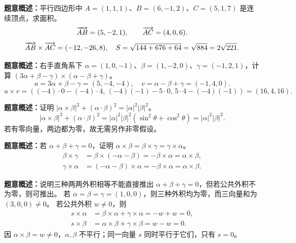 \textbf{题意概述：}平行四边形中 $A=(1,1,1)$、$B=(6,-1,2)$、$C=(5,1,7)$ 是连续顶点，求面积。
\[
\overrightarrow{AB}=(5,-2,1),\qquad \overrightarrow{AC}=(4,0,6).
\]
\[
\overrightarrow{AB}\times\overrightarrow{AC}=(-12,-26,8),
\quad S=\sqrt{144+676+64}=\sqrt{884}=2\sqrt{221}.
\]

\textbf{题意概述：}右手直角系下 $\alpha=(1,0,-1)$、$\beta=(1,-2,0)$、$\gamma=(-1,2,1)$，计算 $(3\alpha+\beta-\gamma)\times(\alpha-\beta+\gamma)$。
\[
u=3\alpha+\beta-\gamma=(5,-4,-4),\quad
v=\alpha-\beta+\gamma=(-1,4,0).
\]
\[
u\times v=\left((-4)\cdot0-(-4)\cdot4,\,
(-4)(-1)-5\cdot0,\,5\cdot4-(-4)(-1)\right)
=(16,4,16).
\]

\textbf{题意概述：}证明 $|\alpha\times\beta|^2+(\alpha\cdot\beta)^2=|\alpha|^2|\beta|^2$。
\[
|\alpha\times\beta|^2+(\alpha\cdot\beta)^2
=|\alpha|^2|\beta|^2(\sin^2\theta+\cos^2\theta)
=|\alpha|^2|\beta|^2.
\]
若有零向量，两边都为零，故无需另作非零假设。

\textbf{题意概述：}若 $\alpha+\beta+\gamma=0$，证明 $\alpha\times\beta=\beta\times\gamma=\gamma\times\alpha$。
\begin{align*}
\beta\times\gamma&=\beta\times(-\alpha-\beta)
=-\beta\times\alpha=\alpha\times\beta,\\
\gamma\times\alpha&=(-\alpha-\beta)\times\alpha
=-\beta\times\alpha=\alpha\times\beta.
\end{align*}

\textbf{题意概述：}说明三种两两外积相等不能直接推出 $\alpha+\beta+\gamma=0$，但若公共外积不为零，则可推出。
若 $\alpha=\beta=\gamma=(1,0,0)$，则三种外积均为零，而三向量和为 $(3,0,0)\neq0$。
若公共外积 $w\neq0$，则
\begin{align*}
s\times\alpha&=\beta\times\alpha+\gamma\times\alpha=-w+w=0,\\
s\times\beta&=\alpha\times\beta+\gamma\times\beta=w-w=0.
\end{align*}
因 $\alpha\times\beta=w\ne0$，$\alpha,\beta$ 不平行；同一向量 $s$ 同时平行于它们，只有 $s=0$。

